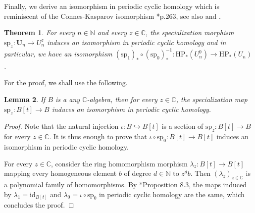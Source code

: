 \documentclass{amsart}
\newtheorem{theorem}{Theorem}[section]
\newtheorem{lemma}[theorem]{Lemma}
\theoremstyle{definition}
\begin{document}
Finally, we derive an isomorphism in periodic cyclic homology which is reminiscent of the Connes-Kasparov isomorphism \cite{BaumConnesHigson}*{p.263}, see also \cites{MAhigson, Afgoustidis3} and \cite{Bradd}.

\begin{theorem}\label{iso_HP}
    For every $n\in \mathbb{N}$ and every $z \in \mathbb{C}$, the specialization morphism $\mathrm{sp}_z : \bm{U}_n \to U^z_n$ induces an isomorphism in periodic cyclic homology and in particular, we have an isomorphism $(\mathrm{sp}_1)_* \circ (\mathrm{sp}_0)_*^{-1} : \mathrm{HP}_*(U^0_n) \to \mathrm{HP}_*(U_n)$.
\end{theorem}

For the proof, we shall use the following.

\begin{lemma}\label{invariance_HP_poly}
    If $B$ is a any $\mathbb{C}$-algebra, then for every $z \in \mathbb{C}$, the specialization map $\mathrm{sp}_z : B[t] \to B$ induces an isomorphism in periodic cyclic homology.
\end{lemma}

\begin{proof}
    Note that the natural injection $\iota : B \hookrightarrow B[t]$ is a section of $\mathrm{sp}_z : B[t] \to B$ for every $z \in \mathbb{C}$. It is thus enough to prove that $\iota \circ \mathrm{sp}_0 : B[t] \to B[t]$ induces an isomorphism in periodic cyclic homology.

    For every $z \in \mathbb{C}$, consider the ring homomorphism morphism $\lambda_z : B[t] \to B[t]$ mapping every homogeneous element $b$ of degree $d \in \mathbb{N}$ to $z^db$. Then $(\lambda_z)_{z \in \mathbb{C}}$ is a polynomial family of homomorphisms. By \cite{CuntzQuillen}*{Proposition 8.3}, the maps induced by $\lambda_1 = \mathrm{id}_{B[t]}$ and $\lambda_0 = \iota \circ \mathrm{sp}_0$ in periodic cyclic homology are the same, which concludes the proof.
\end{proof}
\end{document}
